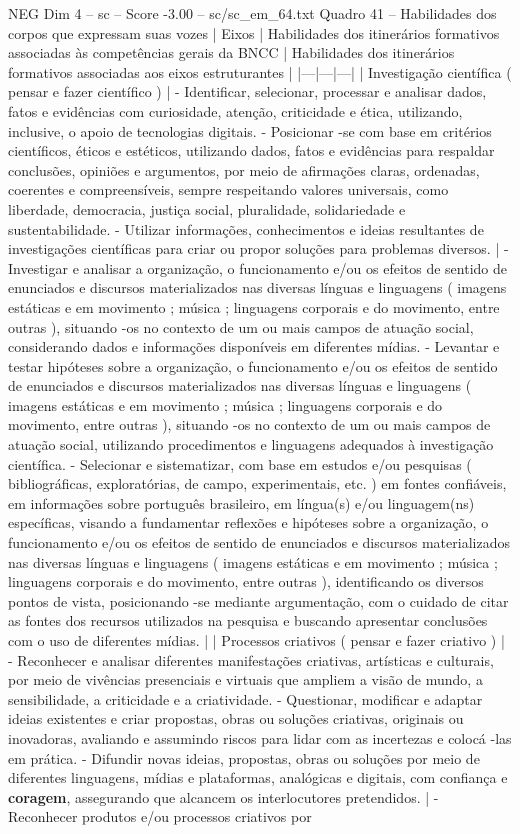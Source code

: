 \begin{textsample}{NEG Dim 4 – sc – Score -3.00 – sc/sc\_em\_64.txt}
Quadro 41 – Habilidades dos corpos que expressam suas vozes | Eixos | Habilidades dos itinerários formativos associadas às competências gerais da BNCC | Habilidades dos itinerários formativos associadas aos eixos estruturantes | |---|---|---| | Investigação científica ( pensar e fazer científico ) | - Identificar, selecionar, processar e analisar dados, fatos e evidências com curiosidade, atenção, criticidade e ética, utilizando, inclusive, o apoio de tecnologias digitais. - Posicionar -se com base em critérios científicos, éticos e estéticos, utilizando dados, fatos e evidências para respaldar conclusões, opiniões e argumentos, por meio de afirmações claras, ordenadas, coerentes e compreensíveis, sempre respeitando valores universais, como liberdade, democracia, justiça social, pluralidade, solidariedade e sustentabilidade. - Utilizar informações, conhecimentos e ideias resultantes de investigações científicas para criar ou propor soluções para problemas diversos. | - Investigar e analisar a organização, o funcionamento e/ou os efeitos de sentido de enunciados e discursos materializados nas diversas línguas e linguagens ( imagens estáticas e em movimento ; música ; linguagens corporais e do movimento, entre outras ), situando -os no contexto de um ou mais campos de atuação social, considerando dados e informações disponíveis em diferentes mídias. - Levantar e testar hipóteses sobre a organização, o funcionamento e/ou os efeitos de sentido de enunciados e discursos materializados nas diversas línguas e linguagens ( imagens estáticas e em movimento ; música ; linguagens corporais e do movimento, entre outras ), situando -os no contexto de um ou mais campos de atuação social, utilizando procedimentos e linguagens adequados à investigação científica. - Selecionar e sistematizar, com base em estudos e/ou pesquisas ( bibliográficas, exploratórias, de campo, experimentais, etc. ) em fontes confiáveis, em informações sobre português brasileiro, em língua(s) e/ou linguagem(ns) específicas, visando a fundamentar reflexões e hipóteses sobre a organização, o funcionamento e/ou os efeitos de sentido de enunciados e discursos materializados nas diversas línguas e linguagens ( imagens estáticas e em movimento ; música ; linguagens corporais e do movimento, entre outras ), identificando os diversos pontos de vista, posicionando -se mediante argumentação, com o cuidado de citar as fontes dos recursos utilizados na pesquisa e buscando apresentar conclusões com o uso de diferentes mídias. | | Processos criativos ( pensar e fazer criativo ) | - Reconhecer e analisar diferentes manifestações criativas, artísticas e culturais, por meio de vivências presenciais e virtuais que ampliem a visão de mundo, a sensibilidade, a criticidade e a criatividade. - Questionar, modificar e adaptar ideias existentes e criar propostas, obras ou soluções criativas, originais ou inovadoras, avaliando e assumindo riscos para lidar com as incertezas e colocá -las em prática. - Difundir novas ideias, propostas, obras ou soluções por meio de diferentes linguagens, mídias e plataformas, analógicas e digitais, com confiança e \textbf{coragem}, assegurando que alcancem os interlocutores pretendidos. | - Reconhecer produtos e/ou processos criativos por 
\end{textsample}
